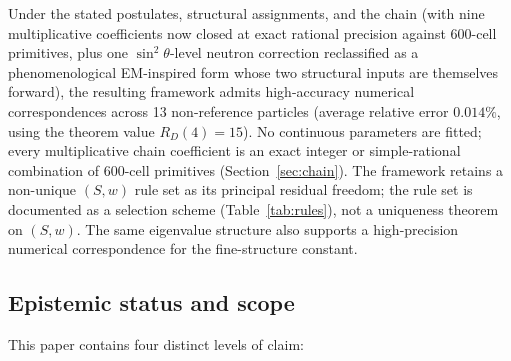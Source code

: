 \documentclass[12pt]{article}
\begin{document}
Under the stated postulates, structural assignments, and the chain (with nine multiplicative coefficients now closed at exact rational precision against 600-cell primitives, plus one $\sin^2\theta$-level neutron correction reclassified as a phenomenological EM-inspired form whose two structural inputs are themselves forward), the resulting framework admits high-accuracy numerical correspondences across 13 non-reference particles (average relative error $0.014\%$, using the theorem value $R_D(4) = 15$). No continuous parameters are fitted; every multiplicative chain coefficient is an exact integer or simple-rational combination of 600-cell primitives (Section~\ref{sec:chain}). The framework retains a non-unique $(S,w)$ rule set as its principal residual freedom; the rule set is documented as a selection scheme (Table~\ref{tab:rules}), not a uniqueness theorem on $(S,w)$. The same eigenvalue structure also supports a high-precision numerical correspondence for the fine-structure constant.

\subsection*{Epistemic status and scope}

This paper contains four distinct levels of claim:
\end{document}
